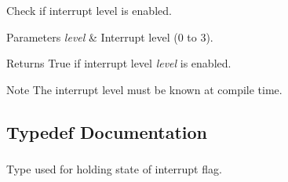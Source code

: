 \-Check if interrupt level is enabled. 


\begin{DoxyParams}{\-Parameters}
{\em level} & \-Interrupt level (0 to 3).\\
\hline
\end{DoxyParams}
\begin{DoxyReturn}{\-Returns}
\-True if interrupt level {\itshape level\/} is enabled.
\end{DoxyReturn}
\begin{DoxyNote}{\-Note}
\-The interrupt level must be known at compile time. 
\end{DoxyNote}


\subsection{\-Typedef \-Documentation}
\hypertarget{group__interrupt__group_ga9aa1f52defc97531b6343233abeea613}{
\subsubsection[{irqflags\-\_\-t}]{}}
\label{group__interrupt__group_ga9aa1f52defc97531b6343233abeea613}


\-Type used for holding state of interrupt flag. 

